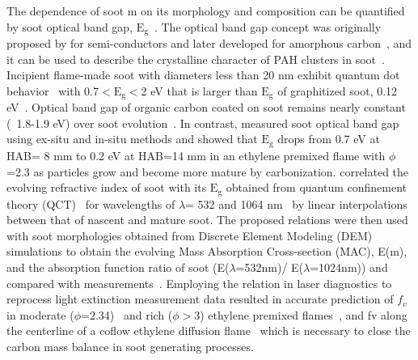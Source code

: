 The dependence of soot m on its morphology and composition can be quantified by soot optical band gap, $\mathrm{E_g}$~\citep{bond2006light}. The optical band gap concept was originally proposed by \citet{tauc1966optical} for semi-conductors and later developed for amorphous carbon~\citep{robertson1987electronic}, and it can be used to describe the crystalline character of PAH clusters in soot~\citep{robertson1987electronic}. Incipient flame-made soot with diameters less than 20 nm exhibit quantum dot behavior~\citep{liu2019flame} with 0.7$< \mathrm{E_g}<$2 eV that is larger than $\mathrm{E_g}$ of graphitized soot, 0.12 eV~\citep{liu2019flame}. Optical band gap of organic carbon coated on soot remains nearly constant (~1.8-1.9 eV) over soot evolution~\citep{le2019soot}. In contrast, \citet{russo2020optical} measured soot optical band gap using ex-situ and in-situ methods and showed that $\mathrm{E_g}$ drops from 0.7 eV at HAB= 8 mm to 0.2 eV at HAB=14 mm in an ethylene premixed flame with $\phi$=2.3 as particles grow and become more mature by carbonization. \citet{kelesidis2019soot} correlated the evolving refractive index of soot with its $\mathrm{E_g}$ obtained from quantum confinement theory (QCT)~\citep{liu2019flame} for wavelengths of $\lambda$= 532 and 1064 nm~\citep{kelesidis2019soot} by linear interpolations between that of nascent and mature soot. The proposed relations were then used with soot morphologies obtained from Discrete Element Modeling (DEM) simulations to obtain the evolving Mass Absorption Cross-section (MAC), E(m), and the absorption function ratio of soot (E($\lambda$=532nm)/ E($\lambda$=1024nm)) and compared with measurements~\citep{bejaoui2015measurements, michelsen2010wavelength, cleon2011laser}. Employing the relation in laser diagnostics to reprocess light extinction measurement data resulted in accurate prediction of $f_v$ in moderate ($\phi$=2.34)~\citep{kelesidis2021determination} and rich ($\phi>$3) ethylene premixed flames~\citep{mei2021formation}, and fv along the centerline of a coflow ethylene diffusion flame~\citep{kelesidis2022santoro} which is necessary to close the carbon mass balance in soot generating processes. 

